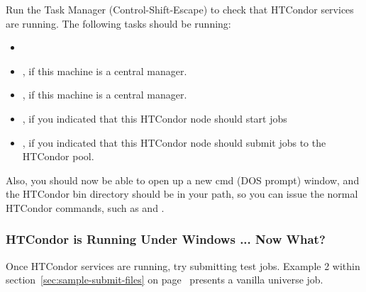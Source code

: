Run the Task Manager (Control-Shift-Escape) to check that HTCondor
services are running.  The following tasks should
be running:  
\begin{itemize}
\item {}
\item {}, if this machine is a central manager.
\item {}, if this machine is a central manager.
\item {}, if you indicated that this HTCondor node should start jobs
\item {}, if you indicated that this HTCondor node should submit jobs
to the HTCondor pool.
\end{itemize}

Also, you should now be able to open up a new cmd (DOS prompt) window, and
the HTCondor bin directory should be in your path, so you can issue the normal
HTCondor commands, such as  and .


\subsubsection{\label{nt-running-now-what}
HTCondor is Running Under Windows ... Now What?}

Once HTCondor services are running, try submitting test jobs.
Example 2 within section~\ref{sec:sample-submit-files} 
on page~\pageref{sec:sample-submit-files} presents a vanilla
universe job.
